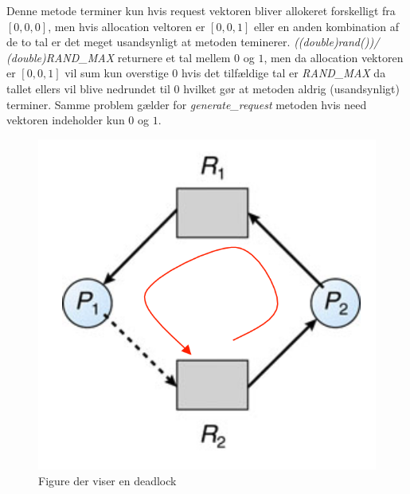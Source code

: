 \documentclass[danish]{report}
\begin{document}
Denne metode terminer kun hvis request vektoren bliver allokeret forskelligt fra $[0,0,0]$, men hvis allocation veltoren er $[0,0,1]$ eller en anden kombination af de to tal er det meget usandsynligt at metoden teminerer. \textit{((double)rand())/ (double)RAND\_MAX} returnere et tal mellem $0$ og $1$, men da allocation vektoren er $[0,0,1]$ vil sum kun overstige $0$ hvis det tilfældige tal er \textit{RAND\_MAX} da tallet ellers vil blive nedrundet til $0$ hvilket gør at metoden aldrig (usandsynligt) terminer. Samme problem gælder for \textit{generate\_request} metoden hvis need vektoren indeholder kun $0$ og $1$.


\begin{figure}[H]
\begin{center}
\includegraphics[scale=0.4]{img/2.png}
\caption{Figure der viser en deadlock}
\label{fig:2}
\end{center}
\end{figure}
\end{document}
